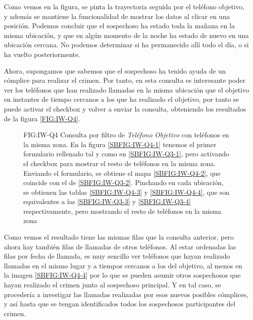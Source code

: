     Como vemos en la figura, se pinta la trayectoria seguida por el teléfono objetivo, y además se mantiene la funcionalidad de mostrar los datos al clicar en una posición. 
    Podemos concluir que el sospechoso ha estado toda la mañana en la misma ubicación, y que en algún momento de la noche ha estado de nuevo en una ubicación cercana. No podemos determinar si ha permanecido allí todo el día, o si ha vuelto posteriormente.
    
    Ahora, supongamos que sabemos que el sospechoso ha tenido ayuda de un cómplice para realizar el crimen. Por tanto, en esta consulta es interesante poder ver los teléfonos que han realizado llamadas en la misma ubicación que el objetivo en instantes de tiempo cercanos a los que ha realizado el objetivo, por tanto se puede activar el checkbox y volver a enviar la consulta, obteniendo los resultados de la figura \ref{FIG:IW-Q4}. 
    
    \begin{figure}[Consulta por filtro de \textit{Teléfono Objetivo} con teléfonos en la misma zona]{FIG:IW-Q4}
      {Consulta por filtro de \textit{Teléfono Objetivo} con teléfonos en la misma zona. En la figura \ref{SBFIG:IW-Q4-1} tenemos el primer formulario rellenado tal y como en \ref{SBFIG:IW-Q3-1}, pero activando el checkbox para mostrar el resto de teléfonos en la misma zona. Enviando el formulario, se obtiene el mapa \ref{SBFIG:IW-Q4-2}, que coincide con el de \ref{SBFIG:IW-Q3-2}. Pinchando en cada ubicación, se obtienen las tablas \ref{SBFIG:IW-Q4-3} y \ref{SBFIG:IW-Q4-4}, que son equivalentes a las \ref{SBFIG:IW-Q3-3} y \ref{SBFIG:IW-Q3-4} respectivamente, pero mostrando el resto de teléfonos en la misma zona}
      \quad
      \quad
      \quad
    \end{figure}
    
    Como vemos el resultado tiene las mismas filas que la consulta anterior, pero ahora hay también filas de llamadas de otros teléfonos.
    Al estar ordenadas las filas por fecha de llamada, es muy sencillo ver teléfonos que hayan realizado llamadas en el mismo lugar y a tiempos cercanos a los del objetivo, al menos en la imagen \ref{SBFIG:IW-Q4-4} por lo que se pueden asumir otros sospechosos que hayan realizado el crimen junto al sospechoso principal. Y en tal caso, se procedería a investigar las llamadas realizadas por esos nuevos posibles cómplices, y así hasta que se tengan identificados todos los sospechosos participantes del crimen.